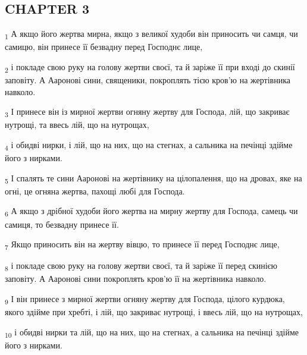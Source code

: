 \subsection{CHAPTER 3}
\begin{tcolorbox}
\textsubscript{1} А якщо його жертва мирна, якщо з великої худоби він приносить чи самця, чи самицю, він принесе її безвадну перед Господнє лице,
\end{tcolorbox}
\begin{tcolorbox}
\textsubscript{2} і покладе свою руку на голову жертви своєї, та й заріже її при вході до скинії заповіту. А Ааронові сини, священики, покроплять тією кров'ю на жертівника навколо.
\end{tcolorbox}
\begin{tcolorbox}
\textsubscript{3} І принесе він із мирної жертви огняну жертву для Господа, лій, що закриває нутрощі, та ввесь лій, що на нутрощах,
\end{tcolorbox}
\begin{tcolorbox}
\textsubscript{4} і обидві нирки, і лій, що на них, що на стегнах, а сальника на печінці здійме його з нирками.
\end{tcolorbox}
\begin{tcolorbox}
\textsubscript{5} І спалять те сини Ааронові на жертівнику на цілопалення, що на дровах, яке на огні, це огняна жертва, пахощі любі для Господа.
\end{tcolorbox}
\begin{tcolorbox}
\textsubscript{6} А якщо з дрібної худоби його жертва на мирну жертву для Господа, самець чи самиця, то безвадну принесе її.
\end{tcolorbox}
\begin{tcolorbox}
\textsubscript{7} Якщо приносить він на жертву вівцю, то принесе її перед Господнє лице,
\end{tcolorbox}
\begin{tcolorbox}
\textsubscript{8} і покладе свою руку на голову жертви своєї, та й заріже її перед скинією заповіту. А Ааронові сини покроплять кров'ю її на жертівника навколо.
\end{tcolorbox}
\begin{tcolorbox}
\textsubscript{9} І він принесе з мирної жертви огняну жертву для Господа, цілого курдюка, якого здійме при хребті, і лій, що закриває нутрощі, і ввесь лій, що на нутрощах,
\end{tcolorbox}
\begin{tcolorbox}
\textsubscript{10} і обидві нирки та лій, що на них, що на стегнах, а сальника на печінці здійме його з нирками.
\end{tcolorbox}

